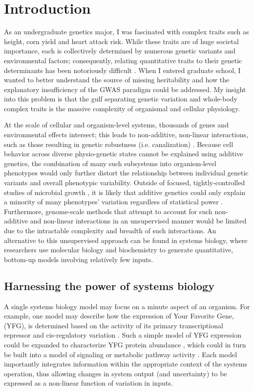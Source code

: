 
\chapter{Introduction\label{ch:intro}}

As an undergraduate genetics major, I was fascinated with complex traits such as height, corn yield and heart attack risk. While these traits are of huge societal importance, each is collectively determined by numerous genetic variants and environmental factors; consequently, relating quantitative traits to their genetic determinants has been notoriously difficult \cite{Manolio:2009jp}. When I entered graduate school, I wanted to better understand the source of missing heritability and how the explanatory insufficiency of the GWAS paradigm could be addressed. My insight into this problem is that the gulf separating genetic variation and whole-body complex traits is the massive complexity of organismal and cellular physiology.

At the scale of cellular and organism-level systems, thousands of genes and environmental effects intersect; this leads to non-additive, non-linear interactions, such as those resulting in genetic robustness (i.e. canalization) \cite{Waddington:1942wy, Szappanos:2011gu}. Because cell behavior across diverse physio-genetic states cannot be explained using additive genetics, the combination of many such subsystems into organism-level phenotypes would only further distort the relationship between individual genetic variants and overall phenotypic variability. Outside of focused, tightly-controlled studies of microbial growth \cite{Bloom:2013bq}, it is likely that additive genetics could only explain a minority of many phenotypes' variation regardless of statistical power \cite{Weedon:2008gc,WellcomeTrustCaseControlConsortium:2007do}. Furthermore, genome-scale methods that attempt to account for such non-additive and non-linear interactions in an unsupervised manner would be limited due to the intractable complexity and breadth of such interactions. An alternative to this unsupervised approach can be found in systems biology, where researchers use molecular biology and biochemistry to generate quantitative, bottom-up models involving relatively few inputs.

\section{Harnessing the power of systems biology}

A single systems biology model may focus on a minute aspect of an organism. For example, one model may describe how the expression of Your Favorite Gene, (YFG), is determined based on the activity of its primary transcriptional repressor and cis-regulatory variation \cite{Nuzhdin:2012ii}. Such a simple model of YFG expression could be expanded to characterize YFG protein abundance \cite{Jovanovic:2015hp}, which could in turn be built into a model of signaling or metabolic pathway activity \cite{Neves:2002bk, Chassagnole:2002ty}.  Each model importantly integrates information within the appropriate context of the systems operation, thus allowing changes in system output (and uncertainty) to be expressed as a non-linear function of variation in inputs.

